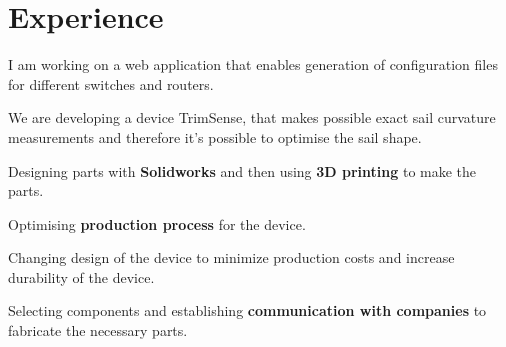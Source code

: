 \documentclass[letterpaper]{deedy-resume} %
\begin{document}
\hfill
%
%
\begin{minipage}[t]{0.66\textwidth} %


\section{Experience}


\vspace{\topsep} %
\begin{tightitemize}
  \item I am working on a web application that enables generation of configuration files for different switches and routers.
\end{tightitemize}

\sectionspace %



\begin{tightitemize}
  \item We are developing a device TrimSense, that makes possible exact sail curvature measurements and therefore it's possible to optimise the sail shape.
  \item Designing parts with \textbf{Solidworks} and then using \textbf{3D printing} to make the parts.
  \item Optimising \textbf{production process} for the device.
  \item Changing design of the device to minimize production costs and increase durability of the device.
  \item Selecting components and establishing \textbf{communication with companies} to fabricate the necessary parts.
\end{tightitemize}


\end{minipage}
\end{document}
